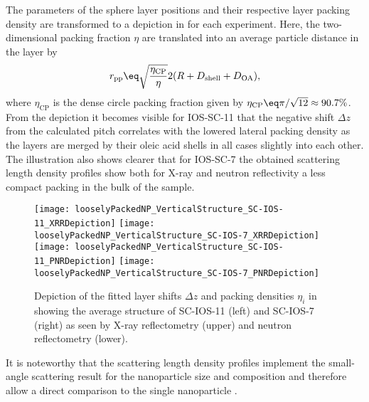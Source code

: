\documentclass[\main/dresen_thesis.tex]{subfiles}
\begin{document}
  The parameters of the sphere layer positions and their respective layer packing density are transformed to a depiction in  for each experiment.
  Here, the two-dimensional packing fraction $\eta$ are translated into an average particle distance in the layer by
  \begin{align}
    r_\mathrm{pp} \eq \sqrt{\frac{\eta_\mathrm{CP}}{\eta}} 2 (R + D_\mathrm{shell} + D_\mathrm{OA}),
  \end{align}
  where $\eta_\mathrm{CP}$ is the dense circle packing fraction given by $\eta_\mathrm{CP} \eq \pi / \sqrt{12} \approx 90.7 \%$.
  From the depiction it becomes visible for IOS-SC-11 that the negative shift $\Delta z$ from the calculated pitch correlates with the lowered lateral packing density as the layers are merged by their oleic acid shells in all cases slightly into each other.
  The illustration also shows clearer that for IOS-SC-7 the obtained scattering length density profiles show both for X-ray and neutron reflectivity a less compact packing in the bulk of the sample.
  \begin{figure}[tb]
    \centering
    \texttt{[image: looselyPackedNP\_VerticalStructure\_SC-IOS-11\_XRRDepiction]}
    \texttt{[image: looselyPackedNP\_VerticalStructure\_SC-IOS-7\_XRRDepiction]}
    \texttt{[image: looselyPackedNP\_VerticalStructure\_SC-IOS-11\_PNRDepiction]}
    \texttt{[image: looselyPackedNP\_VerticalStructure\_SC-IOS-7\_PNRDepiction]}
    \caption{\label{fig:looselyPackedNP:layer:reflectivityDepiction}Depiction of the fitted layer shifts $\Delta z$ and packing densities $\eta_i$ in  showing the average structure of SC-IOS-11 (left) and SC-IOS-7 (right) as seen by X-ray reflectometry (upper) and neutron reflectometry (lower).}
  \end{figure}

  It is noteworthy that the scattering length density profiles implement the small-angle scattering result for the nanoparticle size and composition and therefore allow a direct comparison to the single nanoparticle .
\end{document}
